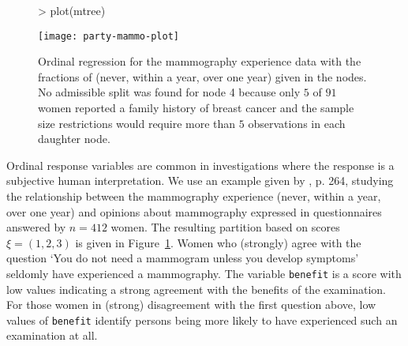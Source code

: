 \documentclass{Z}
\begin{document}
\begin{figure}[t]
\begin{center}
\begin{Schunk}
\begin{Sinput}
> plot(mtree)
\end{Sinput}
\end{Schunk}
\texttt{[image: party-mammo-plot]}
\caption{Ordinal regression for the mammography experience data with the
fractions of (never, within a year, over one year) given in the nodes.
No admissible split was found for node 4 because only $5$ of $91$ women reported 
a family history of breast cancer and the sample size restrictions would 
require more than $5$ observations in each daughter node. \label{mammoexp}}
\end{center}
\end{figure}


Ordinal response variables are common in investigations where the response
is a subjective human interpretation. 
We use an example given by \cite{HosmerLemeshow2000}, p. 264, 
studying the relationship between the mammography experience (never,
within a year, over one year) and opinions about mammography expressed in
questionnaires answered by $n = 412$ women. The resulting partition based on
scores $\xi = (1,2,3)$ is given in Figure~\ref{mammoexp}. 
Women who (strongly) agree with the question `You do not need a mammogram unless
you develop symptoms' seldomly have experienced a mammography. The variable
\texttt{benefit} is a score with low values indicating a strong agreement with the
benefits of the examination. For those women in (strong) disagreement with the first
question above, low values of \texttt{benefit} identify persons being more likely to have 
experienced such an examination at all. 


\end{document}
